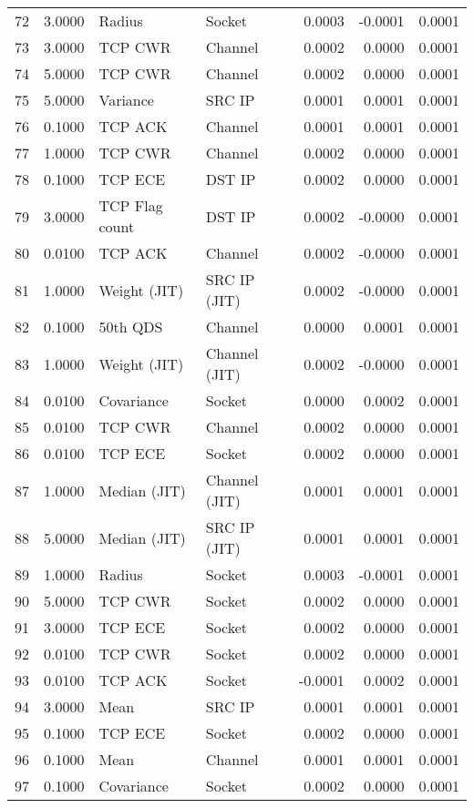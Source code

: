 \begin{longtable}{lrllrrr}
72 & 3.0000 & Radius & Socket & 0.0003 & -0.0001 & 0.0001 \\
73 & 3.0000 & TCP CWR & Channel & 0.0002 & 0.0000 & 0.0001 \\
74 & 5.0000 & TCP CWR & Channel & 0.0002 & 0.0000 & 0.0001 \\
75 & 5.0000 & Variance & SRC IP & 0.0001 & 0.0001 & 0.0001 \\
76 & 0.1000 & TCP ACK & Channel & 0.0001 & 0.0001 & 0.0001 \\
77 & 1.0000 & TCP CWR & Channel & 0.0002 & 0.0000 & 0.0001 \\
78 & 0.1000 & TCP ECE & DST IP & 0.0002 & 0.0000 & 0.0001 \\
79 & 3.0000 & TCP Flag count & DST IP & 0.0002 & -0.0000 & 0.0001 \\
80 & 0.0100 & TCP ACK & Channel & 0.0002 & -0.0000 & 0.0001 \\
81 & 1.0000 & Weight (JIT) & SRC IP (JIT) & 0.0002 & -0.0000 & 0.0001 \\
82 & 0.1000 & 50th QDS & Channel & 0.0000 & 0.0001 & 0.0001 \\
83 & 1.0000 & Weight (JIT) & Channel (JIT) & 0.0002 & -0.0000 & 0.0001 \\
84 & 0.0100 & Covariance & Socket & 0.0000 & 0.0002 & 0.0001 \\
85 & 0.0100 & TCP CWR & Channel & 0.0002 & 0.0000 & 0.0001 \\
86 & 0.0100 & TCP ECE & Socket & 0.0002 & 0.0000 & 0.0001 \\
87 & 1.0000 & Median (JIT) & Channel (JIT) & 0.0001 & 0.0001 & 0.0001 \\
88 & 5.0000 & Median (JIT) & SRC IP (JIT) & 0.0001 & 0.0001 & 0.0001 \\
89 & 1.0000 & Radius & Socket & 0.0003 & -0.0001 & 0.0001 \\
90 & 5.0000 & TCP CWR & Socket & 0.0002 & 0.0000 & 0.0001 \\
91 & 3.0000 & TCP ECE & Socket & 0.0002 & 0.0000 & 0.0001 \\
92 & 0.0100 & TCP CWR & Socket & 0.0002 & 0.0000 & 0.0001 \\
93 & 0.0100 & TCP ACK & Socket & -0.0001 & 0.0002 & 0.0001 \\
94 & 3.0000 & Mean & SRC IP & 0.0001 & 0.0001 & 0.0001 \\
95 & 0.1000 & TCP ECE & Socket & 0.0002 & 0.0000 & 0.0001 \\
96 & 0.1000 & Mean & Channel & 0.0001 & 0.0001 & 0.0001 \\
97 & 0.1000 & Covariance & Socket & 0.0002 & 0.0000 & 0.0001 \\

\end{longtable}
